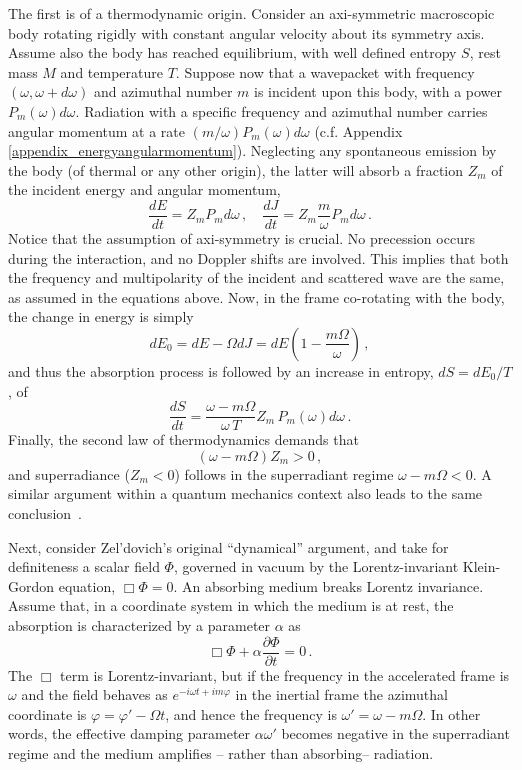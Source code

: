\documentclass[11pt]{article}
\newcommand{\be}{\begin{equation}}
\newcommand{\ee}{\end{equation}}
\numberwithin{equation}{section} %
\begin{document}
The first is of a thermodynamic origin. Consider an axi-symmetric macroscopic body
rotating rigidly with constant angular velocity about its symmetry axis.
Assume also the body has reached equilibrium, with well defined entropy $S$,
rest mass $M$ and temperature $T$.
%
Suppose now that a wavepacket with frequency $(\omega,\omega+d\omega)$ and azimuthal number $m$
is incident upon this body, with a power $P_m(\omega)d\omega$. Radiation with a specific
frequency and azimuthal number carries angular momentum
at a rate $(m/\omega)P_m(\omega) d\omega$ (c.f. Appendix \ref{appendix_energyangularmomentum}). Neglecting any spontaneous emission by the body
(of thermal or any other origin), the latter will absorb a fraction $Z_{m}$ of the incident energy and angular momentum,
%
\be
\frac{dE}{dt}=Z_{m} P_md\omega\,,\quad \frac{dJ}{dt}=Z_{m} \frac{m}{\omega} P_m d\omega\,.
\ee
% 
Notice that the assumption of axi-symmetry is crucial. No precession occurs during the interaction,
and no Doppler shifts are involved. This implies that both the frequency and multipolarity of the incident
and scattered wave are the same, as assumed in the equations above.
Now, in the frame co-rotating with the body, the change in energy is simply~\cite{Landau:Statistical}
%
\be
dE_0=dE-\Omega dJ=dE\left(1-\frac{m\Omega}{\omega}\right)\,,\label{energy_transform}
\ee
%
and thus the absorption process is followed by an increase in entropy, $dS=dE_0/T$, of
%
\be
\frac{dS}{dt}=\frac{\omega-m\Omega}{\omega\,T}Z_{m}\,P_m(\omega)d\omega\,.
\ee
%
Finally, the second law of thermodynamics demands that 
%
\be
(\omega-m\Omega)Z_{m}>0\,,
\ee
%
and superradiance ($Z_{m}<0$) follows in the superradiant regime $\omega-m\Omega<0$. A similar argument within a quantum mechanics context also leads to the same conclusion~\cite{Alicki:2017bgh}.





Next, consider Zel'dovich's original ``dynamical'' argument, and take for definiteness a scalar field $\Phi$,
governed in vacuum by the Lorentz-invariant Klein-Gordon equation, $\Box \Phi=0$.
An absorbing medium breaks Lorentz invariance. Assume that, in a coordinate system in which
the medium is at rest, the absorption is characterized by a parameter $\alpha$ as
%
\be
\Box \Phi+\alpha\frac{\partial \Phi}{\partial t}=0\,. \label{KGdiss}
\ee
%
The $\Box$ term is Lorentz-invariant, but if the frequency in the accelerated frame is $\omega$ and the field behaves as $e^{-i\omega t+im\varphi}$ in the inertial frame the azimuthal coordinate is $\varphi=\varphi'-\Omega t$, and hence the frequency is $\omega'=\omega-m\Omega$. In other words, the effective damping parameter $\alpha \omega'$ becomes negative in the superradiant regime and the medium amplifies -- rather than absorbing-- radiation.
\end{document}
